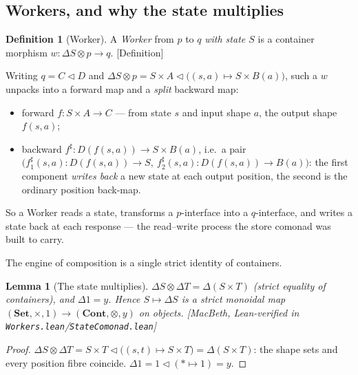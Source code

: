 \documentclass[11pt,a4paper]{book}
\newcommand{\Set}{\mathbf{Set}}
\newcommand{\Cont}{\mathbf{Cont}}
\newcommand{\y}{y}
\newcommand{\cont}[2]{#1 \triangleleft #2}
\newcommand{\sh}{\sharp}
\theoremstyle{plain}
\newtheorem{Lemma}[Theorem]{Lemma}
\theoremstyle{definition}
\newtheorem{Definition}[Theorem]{Definition}
\theoremstyle{remark}
\newcommand{\prov}[1]{\hfill\textsf{\footnotesize[#1]}}
\begin{document}
\subsection{Workers, and why the state multiplies}
\label{sec:workers-cat}

\begin{Definition}[Worker]\label{def:worker}
A \emph{Worker} from $p$ to $q$ \emph{with state $S$} is a container morphism $w\colon\Delta S\otimes p\to q$.
\prov{Definition}
\end{Definition}

Writing $q=\cont CD$ and $\Delta S\otimes p=\cont{S\times A}{\bigl((s,a)\mapsto S\times B(a)\bigr)}$, such a
$w$ unpacks into a forward map and a \emph{split} backward map:
\begin{itemize}[nosep]
  \item forward $f\colon S\times A\to C$ --- from state $s$ and input shape $a$, the output shape $f(s,a)$;
  \item backward $f^{\sh}\colon D(f(s,a))\to S\times B(a)$, i.e.\ a pair
    $\bigl(f^{\sh}_{1}(s,a)\colon D(f(s,a))\to S,\ f^{\sh}_{2}(s,a)\colon D(f(s,a))\to B(a)\bigr)$: the first
    component \emph{writes back} a new state at each output position, the second is the ordinary
    position back-map.
\end{itemize}
So a Worker reads a state, transforms a $p$-interface into a $q$-interface, and writes a state back at each
response --- the read--write process the store comonad was built to carry.

The engine of composition is a single strict identity of containers.

\begin{Lemma}[The state multiplies]\label{lem:delta-mult}
$\Delta S\otimes\Delta T=\Delta(S\times T)$ (strict equality of containers), and $\Delta 1=\y$. Hence
$S\mapsto\Delta S$ is a strict monoidal map $(\Set,\times,1)\to(\Cont,\otimes,\y)$ on objects.
\prov{MacBeth, Lean-verified in \texttt{Workers.lean}/\texttt{StateComonad.lean}\protect\footnotemark}
\end{Lemma}

\begin{proof}
$\Delta S\otimes\Delta T=\cont{S\times T}{\bigl((s,t)\mapsto S\times T\bigr)}=\Delta(S\times T)$: the shape
sets and every position fibre coincide. $\Delta 1=\cont 1{(*\mapsto 1)}=\y$.
\end{proof}
\end{document}
